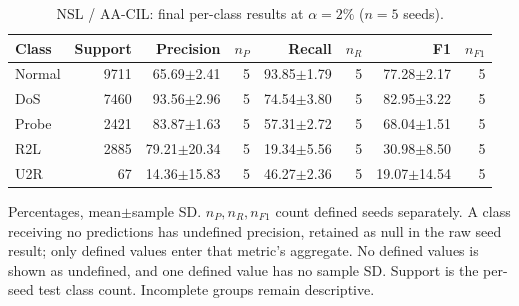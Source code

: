 \begin{table}[t]
\centering\scriptsize
\setlength{\tabcolsep}{3.3pt}
\caption{NSL / AA-CIL: final per-class results at $\alpha=2\%$ ($n=5$ seeds).}\label{tab:forgetting-class-nsl_kdd-aacil}
\begin{tabular}{lrrrrrrr}
\toprule
Class & Support & Precision & $n_P$ & Recall & $n_R$ & F1 & $n_{F1}$ \\
\midrule
Normal & 9711 & 65.69$\pm$2.41 & 5 & 93.85$\pm$1.79 & 5 & 77.28$\pm$2.17 & 5 \\
DoS & 7460 & 93.56$\pm$2.96 & 5 & 74.54$\pm$3.80 & 5 & 82.95$\pm$3.22 & 5 \\
Probe & 2421 & 83.87$\pm$1.63 & 5 & 57.31$\pm$2.72 & 5 & 68.04$\pm$1.51 & 5 \\
R2L & 2885 & 79.21$\pm$20.34 & 5 & 19.34$\pm$5.56 & 5 & 30.98$\pm$8.50 & 5 \\
U2R & 67 & 14.36$\pm$15.83 & 5 & 46.27$\pm$2.36 & 5 & 19.07$\pm$14.54 & 5 \\
\bottomrule
\end{tabular}
\par\smallskip\begin{minipage}{0.98\textwidth}\scriptsize Percentages, mean$\pm$sample SD. $n_P,n_R,n_{F1}$ count defined seeds separately. A class receiving no predictions has undefined precision, retained as null in the raw seed result; only defined values enter that metric's aggregate. No defined values is shown as undefined, and one defined value has no sample SD. Support is the per-seed test class count. Incomplete groups remain descriptive.\end{minipage}
\end{table}

